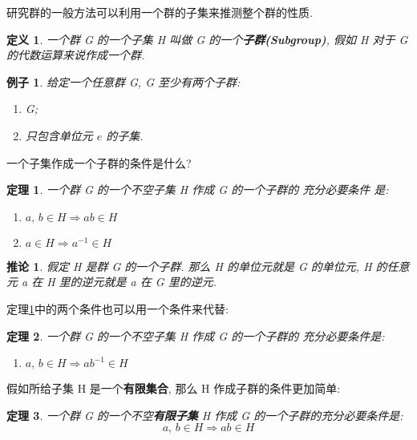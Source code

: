 \documentclass[utf8]{ctexbook}
\newtheorem{theorem}{定理}[section]
\newtheorem{definition}{定义}[section]
\newtheorem{example}{例子}[section]
\newtheorem{corollary}{推论}[section]
\begin{document}
研究群的一般方法可以利用一个群的子集来推测整个群的性质.

\begin{definition}
一个群 G 的一个子集 H 叫做 G 的一个\textbf{子群(Subgroup)}, 假如 H 对于 G 的代数运算来说作成一个群.
\end{definition}

\begin{example}
给定一个任意群 G, G 至少有两个子群:
\begin{enumerate}
\item{G;}
\item{只包含单位元 $e$ 的子集.}
\end{enumerate}
\end{example}

一个子集作成一个子群的条件是什么?
\begin{theorem}\label{subgroup_iff_1}
一个群 G 的一个不空子集 H 作成 G 的一个子群的 \emph{充分必要条件} 是:
\begin{enumerate}
\item[(i) ]{$a, \, b \in H \Longrightarrow ab \in H  $}
\item[(ii) ]{$a \in H \Longrightarrow a^{-1} \in H$}
\end{enumerate}
\end{theorem}

\begin{corollary}
假定 H 是群 G 的一个子群. 那么 H 的单位元就是 G 的单位元, H 的任意元 a 在 H 里的逆元就是 a 在 G 里的逆元.
\end{corollary}

定理\ref{subgroup_iff_1}中的两个条件也可以用一个条件来代替:

\begin{theorem}
一个群 G 的一个不空子集 H 作成 G 的一个子群的 充分必要条件是:
\begin{enumerate}
\item[(iii) ]{$a, \, b \in H \Longrightarrow ab^{-1} \in H$}
\end{enumerate}
\end{theorem}

假如所给子集 H 是一个\textbf{有限集合}, 那么 H 作成子群的条件更加简单:

\begin{theorem}
一个群 G 的一个不空\textbf{有限子集} H 作成 G 的一个子群的充分必要条件是:
\begin{equation}
a, \, b \in H \Longrightarrow ab \in H \nonumber
\end{equation}
\end{theorem}
\end{document}
